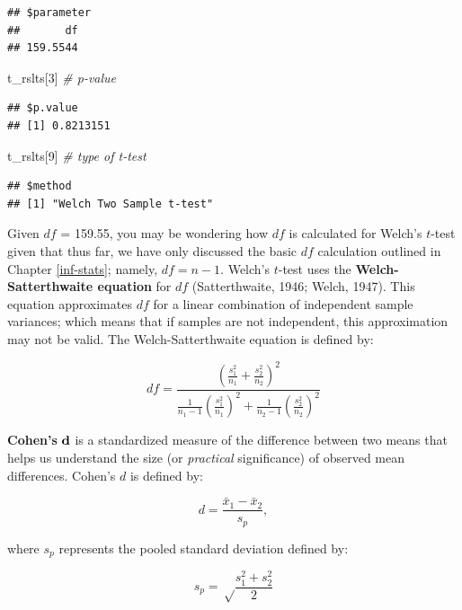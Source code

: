 \documentclass[
]{book}
\newenvironment{Shaded}{\begin{snugshade}}{\end{snugshade}}
\newcommand{\CommentTok}[1]{\textcolor[rgb]{0.56,0.35,0.01}{\textit{#1}}}
\newcommand{\DecValTok}[1]{\textcolor[rgb]{0.00,0.00,0.81}{#1}}
\newcommand{\NormalTok}[1]{#1}
\begin{document}
\begin{verbatim}
## $parameter
##       df 
## 159.5544
\end{verbatim}

\begin{Shaded}
\begin{Highlighting}[]
\NormalTok{t\_rslts[}\DecValTok{3}\NormalTok{] }\CommentTok{\# p{-}value}
\end{Highlighting}
\end{Shaded}

\begin{verbatim}
## $p.value
## [1] 0.8213151
\end{verbatim}

\begin{Shaded}
\begin{Highlighting}[]
\NormalTok{t\_rslts[}\DecValTok{9}\NormalTok{] }\CommentTok{\# type of t{-}test}
\end{Highlighting}
\end{Shaded}

\begin{verbatim}
## $method
## [1] "Welch Two Sample t-test"
\end{verbatim}

Given \(df\) = 159.55, you may be wondering how \(df\) is calculated for Welch's \(t\)-test given that thus far, we have only discussed the basic \(df\) calculation outlined in Chapter \ref{inf-stats}; namely, \(df = n - 1\). Welch's \(t\)-test uses the \textbf{Welch-Satterthwaite equation} for \(df\) (Satterthwaite, 1946; Welch, 1947). This equation approximates \(df\) for a linear combination of independent sample variances; which means that if samples are not independent, this approximation may not be valid. The Welch-Satterthwaite equation is defined by:

\[ df = \frac {(\frac{s^2_1}{n_1} + \frac{s^2_2}{n_2})^2} {\frac{1}{n_1 - 1} (\frac{s^2_1}{n_1})^2 + \frac{1}{n_2 - 1} (\frac{s^2_2}{n_2})^2} \]

\textbf{Cohen's} \(\textbf d\) is a standardized measure of the difference between two means that helps us understand the size (or \emph{practical} significance) of observed mean differences. Cohen's \(d\) is defined by:

\[ d = \frac{\bar{x}_1 - \bar{x}_2} {s_p},  \]

where \(s_p\) represents the pooled standard deviation defined by:

\[ s_p = \sqrt\frac{s^2_1 + s^2_2}{2} \]
\end{document}
